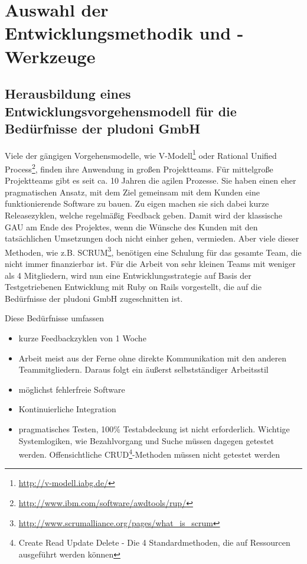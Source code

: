 \section{Auswahl der Entwicklungsmethodik und -Werkzeuge}
\subsection{Herausbildung eines Entwicklungsvorgehensmodell für die Bedürfnisse der pludoni GmbH}
Viele der gängigen Vorgehensmodelle, wie V-Modell\footnote{\url{http://v-modell.iabg.de/}} oder Rational Unified Process\footnote{\url{http://www.ibm.com/software/awdtools/rup/}}, finden ihre Anwendung in großen Projektteams. Für mittelgroße Projektteams gibt es seit ca. 10 Jahren die agilen Prozesse. Sie haben einen eher pragmatischen Ansatz, mit dem Ziel gemeinsam mit dem Kunden eine funktionierende Software zu bauen. Zu eigen machen sie sich dabei kurze Releasezyklen, welche regelmäßig Feedback geben. Damit wird der klassische GAU am Ende des Projektes, wenn die Wünsche des Kunden mit den tatsächlichen Umsetzungen doch nicht einher gehen, vermieden. Aber viele dieser Methoden, wie z.B. SCRUM\footnote{\url{http://www.scrumalliance.org/pages/what_is_scrum}}, benötigen eine Schulung für das gesamte Team, die nicht immer finanzierbar ist. 
Für die Arbeit von sehr kleinen Teams mit weniger als 4 Mitgliedern, wird nun eine Entwicklungsstrategie auf Basis der Testgetriebenen Entwicklung mit Ruby on Rails vorgestellt, die auf die Bedürfnisse der pludoni GmbH zugeschnitten ist.

Diese Bedürfnisse umfassen 
\begin{itemize}
 \item kurze Feedbackzyklen von 1 Woche
 \item Arbeit meist aus der Ferne ohne direkte Kommunikation mit den anderen Teammitgliedern. Daraus folgt ein äußerst selbstständiger Arbeitsstil
 \item möglichst fehlerfreie Software
 \item Kontinuierliche Integration
 \item pragmatisches Testen, 100\% Testabdeckung ist nicht erforderlich. Wichtige Systemlogiken, wie Bezahlvorgang und Suche müssen dagegen getestet werden. Offensichtliche CRUD\footnote{Create Read Update Delete - Die 4 Standardmethoden, die auf Ressourcen ausgeführt werden können}-Methoden müssen nicht getestet werden
 
\end{itemize}

